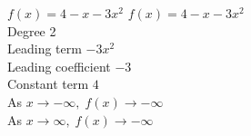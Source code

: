 {$f(x) = 4-x-3x^2$}
{$f(x) = 4-x-3x^2$ \\
Degree 2 \\
Leading term $-3x^{2}$\\
Leading coefficient $-3$\\
Constant term $4$\\
As $x \rightarrow -\infty, \; f(x) \rightarrow -\infty$\\
As $x \rightarrow \infty, \; f(x) \rightarrow -\infty$}